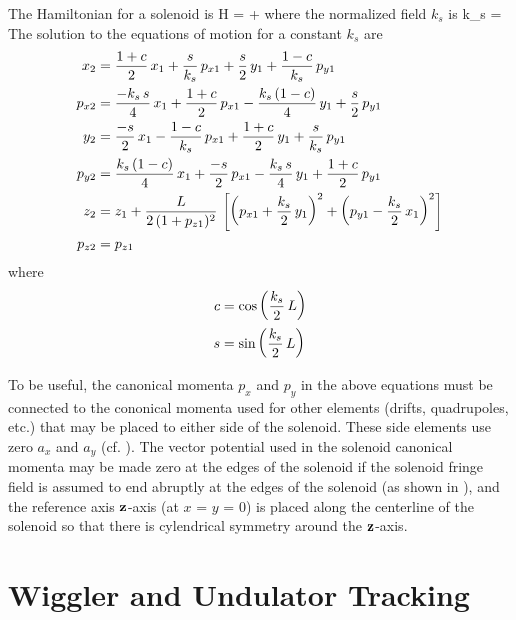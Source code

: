 The Hamiltonian for a solenoid is
\Begineq
  H =  + 
\Endeq
where the normalized field $k_s$ is
\Begineq
  k_s = 
\Endeq
The solution to the equations of motion for a constant $k_s$ are
\begin{align}
  x_2    &= \frac{1 + c}{2} \, x_1 + \frac{s}{k_s} \, p_{x1} +
           \frac{s}{2} \, y_1 + \frac{1 - c}{k_s} \, p_{y1} \nonumber \\
  p_{x2} &= \frac{-k_s \, s}{4} \, x_1 + \frac{1 + c}{2} \, p_{x1} - 
           \frac{k_s \, (1 - c)}{4} \, y_1 + \frac{s}{2} \, p_{y1} \nonumber \\
  y_2    &= \frac{-s}{2} \, x_1 - \frac{1 - c}{k_s} \, p_{x1} +
           \frac{1 + c}{2} \, y_1 + \frac{s}{k_s} \, p_{y1} \\      
  p_{y2} &= \frac{k_s \, (1 - c)}{4} \, x_1 + \frac{-s}{2} \, p_{x1} -
            \frac{k_s \, s}{4} \, y_1 + \frac{1 + c}{2} \, p_{y1} \nonumber \\ 
  z_2    &= z_1 + \frac{L}{2 \, (1 + p_{z1})^2} \, 
                   \left[ \left( p_{x1} + \frac{k_s}{2} \, y_1 \right)^2 +
                          \left( p_{y1} - \frac{k_s}{2} \, x_1 \right)^2 \right] \nonumber \\
  p_{z2} &= p_{z1} \nonumber
\end{align}
where
\begin{align}
  c &= \cos \left( \frac{k_s}{2} \, L \right) \nonumber \\
  s &= \sin \left( \frac{k_s}{2} \, L \right)
\end{align}

To be useful, the canonical momenta $p_x$ and $p_y$ in the above
equations must be connected to the cononical momenta used for other
elements (drifts, quadrupoles, etc.) that may be placed to either side
of the solenoid. These side elements use zero $a_x$ and $a_y$
(cf. ). The vector potential used in the solenoid canonical
momenta may be made zero at the edges of the solenoid if the solenoid
fringe field is assumed to end abruptly at the edges of the solenoid
(as shown in ), and the reference axis ${\bf z}$-axis (at
$x$ = $y$ = 0) is placed along the centerline of the solenoid so that
there is cylendrical symmetry around the ${\bf z}$-axis.

\section{Wiggler and Undulator Tracking}
\label{s:wiggler.std}

